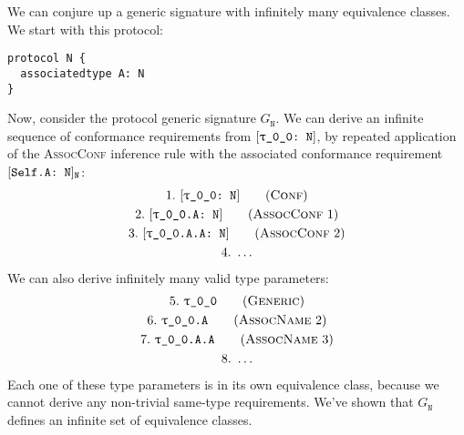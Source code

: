 \documentclass[../generics]{subfiles}
\begin{document}
\begin{example}\label{protocol n example}
We can conjure up a generic signature with infinitely many equivalence classes. We start with this protocol:
\begin{Verbatim}
protocol N {
  associatedtype A: N
}
\end{Verbatim}
Now, consider the protocol generic signature $G_\texttt{N}$. We can derive an infinite sequence of conformance requirements from $\ConfReq{\rT}{N}$, by repeated application of the \textsc{AssocConf} inference rule with the associated conformance requirement $[\texttt{Self.A:~N}]_{\texttt{N}}$:
\begin{gather*}
\ConfStep{\rT}{N}{1}\\
\AssocConfStep{1}{\rT.A}{N}{2}\\
\AssocConfStep{2}{\rT.A.A}{N}{3}\\
4.\ \ldots
\end{gather*}
We can also derive infinitely many valid type parameters:
\begin{gather*}
\GenericStep{\rT}{5}\\
\AssocNameStep{2}{\rT.A}{6}\\
\AssocNameStep{3}{\rT.A.A}{7}\\
8.\ \ldots
\end{gather*}
Each one of these type parameters is in its own equivalence class, because we cannot derive any non-trivial same-type requirements. We've shown that $G_\texttt{N}$ defines an infinite set of equivalence classes.
\end{example}
\end{document}
